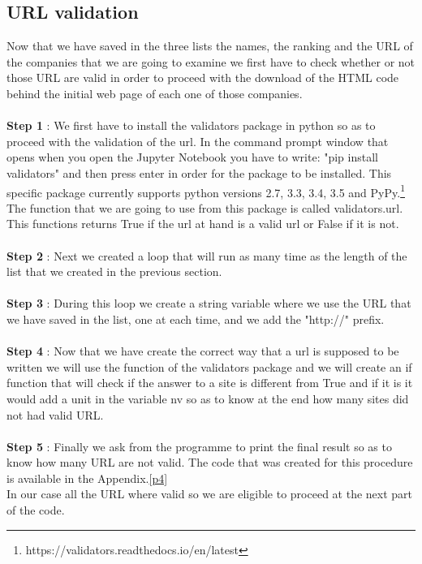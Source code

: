 \documentclass{book}
\begin{document}
\subsection{URL validation}
Now that we have saved in the three lists the names, the ranking and the URL of the companies that we are going to examine we first have to check whether or not those URL are valid in order to proceed with the download of the HTML code behind the initial web page of each one of those companies.\\\\
\textbf{Step 1} : We first have to install the validators package in python so as to proceed with the validation of the url. In the command prompt window that opens when you open the Jupyter Notebook you have to write: "pip install validators" and then press enter in order for the package to be installed. This specific package currently supports python versions 2.7, 3.3, 3.4, 3.5 and PyPy.\footnote{https://validators.readthedocs.io/en/latest} The function that we are going to use from this package is called validators.url. This functions returns True if the url at hand is a valid url or False if it is not.\\\\
\textbf{Step 2} : Next we created a loop that will run as many time as the length of the list that we created in the previous section.\\\\
\textbf{Step 3} : During this loop we create a string variable where we use the URL that we have saved in the list, one at each time, and we add the "http://" prefix.\\\\
\textbf{Step 4} : Now that we have create the correct way that a url is supposed to be written we will use the function of the validators package and we will create an if function that will check if the answer to a site is different from True and if it is it would add a unit in the variable nv so as to know at the end how many sites did not had valid URL.\\\\
\textbf{Step 5} : Finally we ask from the programme to print the final result so as to know how many URL are not valid. The code that was created for this procedure is available in the Appendix.\ref{p4}\\
In our case all the URL where valid so we are eligible to proceed at the next part of the code.
\end{document}
